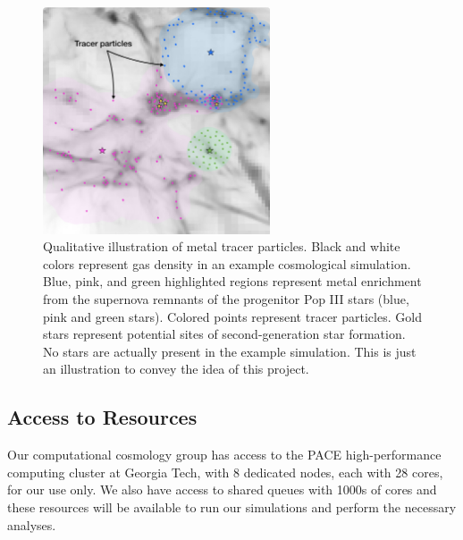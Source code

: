 \documentclass[letterpaper, 12pt]{article}
\begin{document}
\begin{figure}
  \includegraphics[width=0.6\textwidth]{figures/tracer_final}
  \caption{Qualitative illustration of metal tracer particles. Black and white colors represent gas density in an example cosmological simulation. Blue, pink, and green highlighted regions represent metal enrichment from the supernova remnants of the progenitor Pop III stars (blue, pink and green stars). Colored points represent tracer particles. Gold stars represent potential sites of second-generation star formation. No stars are actually present in the example simulation. This is just an illustration to convey the idea of this project.}
  \label{fig:tracer}    
\end{figure}


\subsection{Access to Resources}

Our computational cosmology group has access to the PACE high-performance computing cluster at Georgia Tech, with 8 dedicated nodes, each with 28 cores, for our use only. We also have access to shared queues with 1000s of cores and these resources will be available to run our simulations and perform the necessary analyses. 
\end{document}
